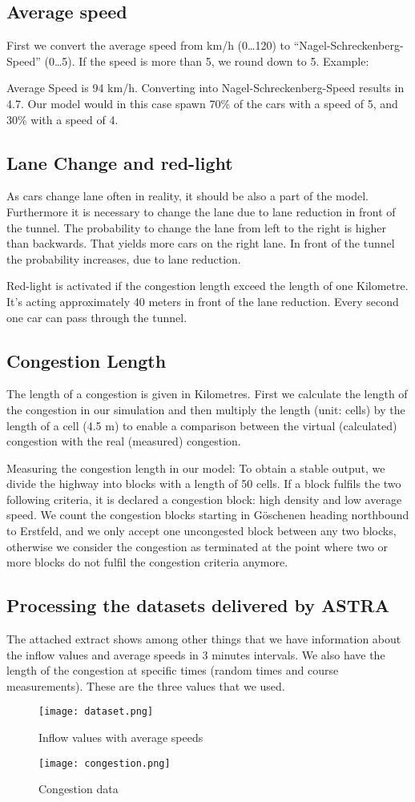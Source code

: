 \subsection{Average speed}
First we convert the average speed from km/h (0\ldots 120) to “Nagel-Schreckenberg-Speed” (0\ldots 5). If the speed is more than 5, we round down to 5.
Example:

Average Speed is 94 km/h. Converting into Nagel-Schreckenberg-Speed results in 4.7. Our model would in this case spawn 70\% of the cars with a speed of 5, and 30\% with a speed of 4.

\subsection{Lane Change and red-light}
As cars change lane often in reality, it should be also a part of the model. Furthermore it is necessary to change the lane due to lane reduction in front of the tunnel. The probability to change the lane from left to the right is higher than backwards. That yields more cars on the right lane. In front of the tunnel the probability increases, due to lane reduction.

Red-light is activated if the congestion length exceed the length of one Kilometre. It's acting approximately 40 meters in front of the lane reduction. Every second one car can pass through the tunnel. 


\subsection{Congestion Length}
The length of a congestion is given in Kilometres. First we calculate the length of the congestion in our simulation and then multiply the length (unit: cells) by the length of a cell (4.5 m) to enable a comparison between the virtual (calculated) congestion with the real (measured) congestion.

Measuring the congestion length in our model: To obtain a stable output, we divide the highway into blocks with a length of 50 cells. If a block fulfils the two following criteria, it is declared a congestion block: high density and low average speed. We count the congestion blocks starting in Göschenen heading northbound to Erstfeld, and we only accept one uncongested block between any two blocks, otherwise we consider the congestion as terminated at the point where two or more blocks do not fulfil the congestion criteria anymore.


\subsection{Processing the datasets delivered by ASTRA}
The attached extract shows among other things that we have information about the inflow values and average speeds in 3 minutes intervals. We also have the length of the congestion at specific times (random times and course measurements). These are the three values that we used.

\begin{figure}[h]
\texttt{[image: dataset.png]}
\caption{Inflow values with average speeds}
\end{figure}

\begin{figure}[h]
\texttt{[image: congestion.png]}
\caption{Congestion data}
\end{figure}